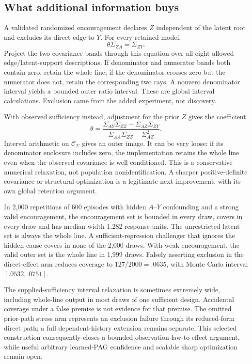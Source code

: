 \subsection{What additional information buys}
A validated randomized encouragement declares $Z$ independent of the latent
root and excludes its direct edge to $Y$. For every retained model,
\begin{equation}
 \theta\Sigma_{ZA}=\Sigma_{ZY}.
 \label{c7:graph-iv-restriction}
\end{equation}
Project the two covariance bands through this equation over all eight allowed
edge/latent-support descriptions. If denominator and numerator bands both
contain zero, retain the whole line; if the denominator crosses zero but the
numerator does not, retain the corresponding two rays. A nonzero denominator
interval yields a bounded outer ratio interval. These are global interval
calculations. Exclusion came from the added experiment, not discovery.

With observed sufficiency instead, adjustment for the prior $Z$ gives the
coefficient
\[
 \theta=\frac{\Sigma_{AY}\Sigma_{ZZ}-\Sigma_{AZ}\Sigma_{ZY}}
              {\Sigma_{AA}\Sigma_{ZZ}-\Sigma_{AZ}^2}.
\]
Interval arithmetic on $\mathcal C_\Sigma$ gives an outer image. It can be
very loose: if its denominator enclosure includes zero, the implementation
retains the whole line even when the observed covariance is well conditioned.
This is a conservative numerical relaxation, not population nonidentification.
A sharper positive-definite covariance or structural optimization is a
legitimate next improvement, with its own global retention argument.

In 2,000 repetitions of 600 episodes with hidden $A$--$Y$ confounding and a
strong valid encouragement, the encouragement set is bounded in every draw,
covers in every draw and has median width 1.282 response units. The
unrestricted latent set is always the whole line. A sufficient-regression
challenger that ignores the hidden cause covers in none of the 2,000 draws.
With weak encouragement, the valid outer set is the whole line in 1,999 draws.
Falsely asserting exclusion in the direct-effect arm reduces coverage to
$127/2000=.0635$, with Monte Carlo interval $[.0532,.0751]$.

The supplied-sufficiency interval relaxation is sometimes extremely wide,
including whole-line output in most draws of one sufficient design. Accidental
coverage under a false premise is not evidence for that premise. The omitted
prior-path stress arm represents an exclusion failure through its reduced-form
direct path; a full dependent-history extension remains separate. This selected
construction consequently closes a bounded observation-law-to-effect argument,
while useful arbitrary learned-PAG confidence and scalable sharp optimization
remain open.



